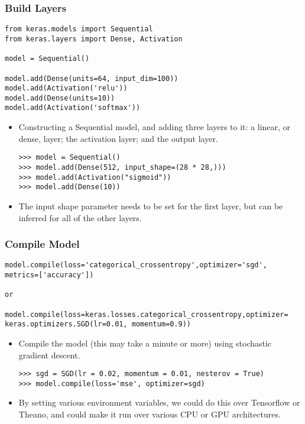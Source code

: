 \begin{frame}[fragile] \frametitle{Build Layers}
\begin{lstlisting}
from keras.models import Sequential
from keras.layers import Dense, Activation

model = Sequential()

model.add(Dense(units=64, input_dim=100))
model.add(Activation('relu'))
model.add(Dense(units=10))
model.add(Activation('softmax'))
\end{lstlisting}

\begin{itemize}
\item Constructing a Sequential model, and
adding three layers to it: a linear, or dense, layer;
the activation layer; and the output layer.
\begin{lstlisting}
>>> model = Sequential()
>>> model.add(Dense(512, input_shape=(28 * 28,)))
>>> model.add(Activation("sigmoid"))
>>> model.add(Dense(10))
\end{lstlisting}
\item The input shape parameter needs to be set for the
first layer, but can be inferred for all of the other
layers.
\end{itemize}
\end{frame}


\begin{frame}[fragile] \frametitle{Compile Model}
\begin{lstlisting}
model.compile(loss='categorical_crossentropy',optimizer='sgd',
metrics=['accuracy'])

or

model.compile(loss=keras.losses.categorical_crossentropy,optimizer=
keras.optimizers.SGD(lr=0.01, momentum=0.9))
\end{lstlisting}

\begin{itemize}
\item Compile the model (this may take a minute
or more) using stochastic gradient descent.
\begin{lstlisting}
>>> sgd = SGD(lr = 0.02, momentum = 0.01, nesterov = True)
>>> model.compile(loss='mse', optimizer=sgd)
\end{lstlisting}
\item By setting various environment variables, we could do this
over Tensorflow or Theano, and could make it run over
various CPU or GPU architectures.
\end{itemize}

\end{frame}

